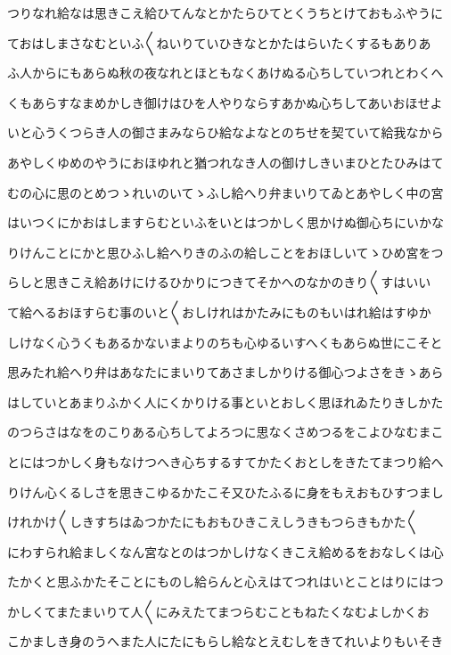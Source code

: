\documentclass[a4paper,11pt,landscape]{ltjtarticle}
\begin{document}
つりなれ給なは思きこえ給ひてんなとかたらひてとくうちとけておもふやうに
\par\medskip
ておはしまさなむといふ〱ねいりていひきなとかたはらいたくするもありあ
\par\medskip
ふ人からにもあらぬ秋の夜なれとほともなくあけぬる心ちしていつれとわくへ
\par\medskip
くもあらすなまめかしき御けはひを人やりならすあかぬ心ちしてあいおほせよ
\par\medskip
いと心うくつらき人の御さまみならひ給なよなとのちせを契ていて給我なから
\par\medskip
あやしくゆめのやうにおほゆれと猶つれなき人の御けしきいまひとたひみはて
\par\medskip
むの心に思のとめつゝれいのいてゝふし給へり弁まいりてゐとあやしく中の宮
\par\medskip
はいつくにかおはしますらむといふをいとはつかしく思かけぬ御心ちにいかな
\par\medskip
りけんことにかと思ひふし給へりきのふの給しことをおほしいてゝひめ宮をつ
\par\medskip
らしと思きこえ給あけにけるひかりにつきてそかへのなかのきり〱すはいい
\par\medskip
て給へるおほすらむ事のいと〱おしけれはかたみにものもいはれ給はすゆか
\par\medskip
しけなく心うくもあるかないまよりのちも心ゆるいすへくもあらぬ世にこそと
\par\medskip
思みたれ給へり弁はあなたにまいりてあさましかりける御心つよさをきゝあら
\par\medskip
はしていとあまりふかく人にくかりける事といとおしく思ほれゐたりきしかた
\par\medskip
のつらさはなをのこりある心ちしてよろつに思なくさめつるをこよひなむまこ
\par\medskip
とにはつかしく身もなけつへき心ちするすてかたくおとしをきたてまつり給へ
\par\medskip
りけん心くるしさを思きこゆるかたこそ又ひたふるに身をもえおもひすつまし
\par\medskip
けれかけ〱しきすちはゐつかたにもおもひきこえしうきもつらきもかた〱
\par\medskip
にわすられ給ましくなん宮なとのはつかしけなくきこえ給めるをおなしくは心
\par\medskip
たかくと思ふかたそことにものし給らんと心えはてつれはいとことはりにはつ
\par\medskip
かしくてまたまいりて人〱にみえたてまつらむこともねたくなむよしかくお
\par\medskip
こかましき身のうへまた人にたにもらし給なとえむしをきてれいよりもいそき
\end{document}
